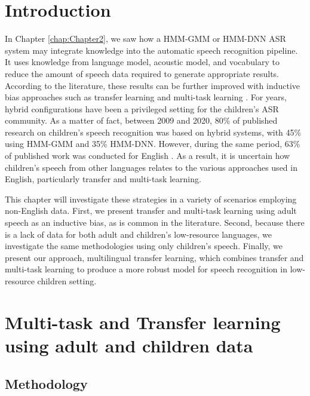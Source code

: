 \label{chap:Chapter3}
\cleardoublepage
\section{Introduction}
In Chapter \ref{chap:Chapter2}, we saw how a HMM-GMM or HMM-DNN ASR system may integrate knowledge into the automatic speech recognition pipeline. It uses knowledge from language model, acoustic model, and vocabulary to reduce the amount of speech data required to generate appropriate results. According to the literature, these results can be further improved with inductive bias approaches such as transfer learning and multi-task learning \cite{TransferLF}. For years, hybrid configurations have been a privileged setting for the children's ASR community. As a matter of fact, between 2009 and 2020, 80\% of published research on children's speech recognition was based on hybrid systems, with 45\% using HMM-GMM and 35\% HMM-DNN. However, during the same period, 63\% of published work was conducted for English \cite{big_review_childASR}. As a result, it is uncertain how children's speech from other languages relates to the various approaches used in English, particularly transfer and multi-task learning.

This chapter will investigate these strategies in a variety of scenarios employing non-English data. First, we present transfer and multi-task learning using adult speech as an inductive bias, as is common in the literature. Second, because there is a lack of data for both adult and children's low-resource languages, we investigate the same methodologies using only children's speech. Finally, we present our approach, multilingual transfer learning, which combines transfer and multi-task learning to produce a more robust model for speech recognition in low-resource children setting.

\section{Multi-task and Transfer learning using adult and children data}
\label{section:HMMDNNADULT2CHILD}
\subsection{Methodology}

